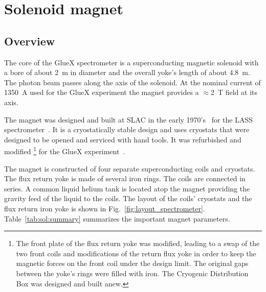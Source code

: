 
\section[Solenoid Magnet]{Solenoid magnet 
  \label{sec:solenoid}
}

\subsection[Overview]{Overview \label{sec:sol:overview}
}

The core of the GlueX spectrometer is a superconducting magnetic
solenoid with a bore of about 2~m in diameter and the overall
yoke's length of about 4.8~m. The photon beam passes along the axis of
the solenoid.  At the nominal current of 1350~A used for the GlueX
experiment the magnet provides a $\approx$2~T field at its axis.

The magnet was designed and built at SLAC in the early
1970's~\cite{Alcorn-confer-1972} for the LASS
spectrometer~\cite{Aston:1987uc}. It is a cryostatically
stable design and uses cryostats that were designed to be opened and
serviced with hand tools. It was refurbished and modified%
\footnote{
  The front plate of the flux return yoke was modified, leading to a
  swap of the two front coils and modifications of the return flux
  yoke in order to keep the magnetic forces on the front coil under
  the design limit.  The original gaps between the yoke's rings were
  filled with iron. The Cryogenic Distribution Box was designed and
  built anew.
} 
for the GlueX experiment~\cite{Ballard:2011tm, Ballard:2015wma}. 

The magnet is constructed of four separate superconducting coils and
cryostats. The flux return yoke is made of several iron rings.  The
coils are connected in series. A common liquid helium tank is located
atop the magnet providing the gravity feed of the liquid to the
coils. The layout of the coils' cryostats and the flux return iron
yoke is shown in Fig.~\ref{fig:layout_spectrometer}.
Table~\ref{tab:sol:summary} summarizes the important magnet
parameters.

  

